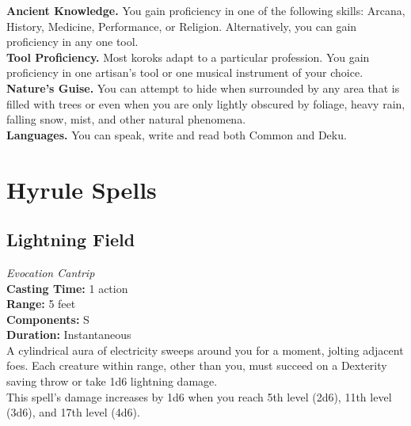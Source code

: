 \documentclass[10pt,twoside,twocolumn,openany]{book}
\begin{document}
\indent \textbf{Ancient Knowledge.} You gain proficiency in one of the following skills: Arcana, History, Medicine, Performance, or Religion. Alternatively, you can gain proficiency in any one tool.\\
\indent \textbf{Tool Proficiency.} Most koroks adapt to a particular profession. You gain proficiency in one artisan's tool or one musical instrument of your choice.\\
\indent \textbf{Nature's Guise.} You can attempt to hide when surrounded by any area that is filled with trees or even when you are only lightly obscured by foliage, heavy rain, falling snow, mist, and other natural phenomena.\\
\indent \textbf{Languages.} You can speak, write and read both Common and Deku.

\chapter{Hyrule Spells}

\section{Lightning Field}
\textit{Evocation Cantrip} \\

\noindent \textbf{Casting Time:} 1 action\\
\textbf{Range:} 5 feet\\
\textbf{Components:} S\\
\textbf{Duration:} Instantaneous\\

\noindent A cylindrical aura of electricity sweeps around you for a moment, jolting adjacent foes. Each creature within range, other than you, must succeed on a Dexterity saving throw or take 1d6 lightning damage. \\
This spell's damage increases by 1d6 when you reach 5th level (2d6), 11th level (3d6), and 17th level (4d6). \\



\end{document}
